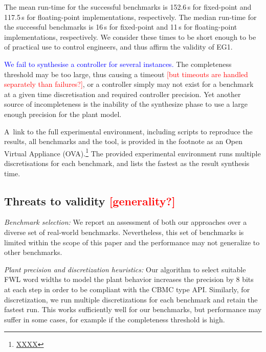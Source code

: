 \documentclass[twocolumn]{autart}    %
\renewcommand{\note}[1]{\textcolor{red}{[#1]}}
\begin{document}
The mean run-time for the successful benchmarks is 152.6\,s for fixed-point and 117.5\,s for floating-point implementations, respectively.  
The median run-time for the successful benchmarks is 16\,s for fixed-point and 11\,s for floating-point implementations, respectively.
We consider these times to be short enough to be of practical use to control engineers, and thus affirm the validity of EG1.

\textcolor{blue}{We fail to synthesise a controller for several instances.}  
The completeness threshold may be too large, thus causing a timeout \note{but timeouts are handled separately than failures?}, 
or a controller simply may not exist for a benchmark at a given time discretisation and required controller precision. 
Yet another source of incompleteness is the inability of the {\sc synthesize} phase to use a large enough precision for the plant model. 

A~link to the full experimental environment, including scripts to reproduce the results, all
benchmarks and the tool, is provided in the
footnote as an Open Virtual Appliance (OVA).\footnote{\url{XXXX}}
The provided experimental environment runs multiple discretisations for each
benchmark, and lists the fastest as the result synthesis time.

\subsection{Threats to validity \note{generality?}}
\label{exp:threats-to-validity}

\textit{Benchmark selection:} We report an assessment of both our approaches
over a diverse set of real-world benchmarks.  Nevertheless, this set of
benchmarks is limited within the scope of this paper and the performance may
not generalize to other benchmarks.

\textit{Plant precision and discretization heuristics:} Our algorithm to
select suitable FWL word widths to model the plant behavior 
increases the precision by 8 bits at each step 
in order to be compliant with the CBMC type API. 
Similarly, for discretization, we run multiple discretizations for each
benchmark and retain the fastest run.
This works sufficiently well for our benchmarks, but
performance may suffer in some cases, for example if the completeness
threshold is high. 
\end{document}
